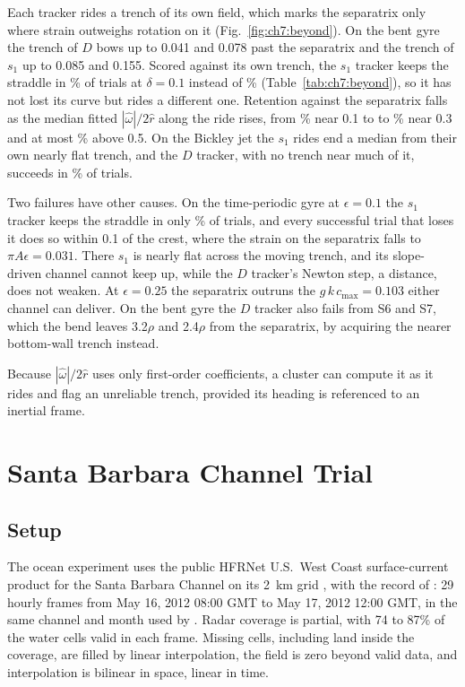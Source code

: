 Each tracker rides a trench of its own field, which marks the separatrix
only where strain outweighs rotation on it (Fig.~\ref{fig:ch7:beyond}). On the bent gyre the trench of $D$ bows up to
0.041 and 0.078 past the separatrix and the trench of $s_1$ up to 0.085
and 0.155. Scored against its own trench, the $s_1$ tracker keeps the
straddle in \% of trials at $\delta = 0.1$ instead of
\% (Table~\ref{tab:ch7:beyond}), so it has not lost its curve but
rides a different one. Retention against the
separatrix falls as the median fitted $|\hat{\omega}|/2\hat{r}$ along the
ride rises, from \% near 0.1 to  to \% near 0.3
and at most \% above 0.5. On the Bickley jet the $s_1$ rides end a
median  from their own nearly flat trench, and the $D$
tracker, with no trench near much of it, succeeds in \% of
trials.

Two failures have other causes. On the time-periodic gyre at
$\epsilon = 0.1$ the $s_1$ tracker keeps the straddle in only \%
of trials, and every successful trial that loses it does so within 0.1 of
the crest, where the strain on the separatrix falls to
$\pi A\epsilon = 0.031$. There $s_1$ is nearly flat across the
moving trench, and its slope-driven channel cannot keep up, while the $D$
tracker's Newton step, a distance, does not weaken. At $\epsilon = 0.25$
the separatrix outruns the $g\,k\,c_{\max} = 0.103$ either channel
can deliver. On the bent gyre the $D$ tracker also fails from S6 and S7,
which the bend leaves 3.2$\rho$ and 2.4$\rho$ from the
separatrix, by acquiring the nearer bottom-wall trench instead.

Because $|\hat{\omega}|/2\hat{r}$ uses only first-order coefficients, a
cluster can compute it as it rides and flag an unreliable trench, provided
its heading is referenced to an inertial frame.

\section{Santa Barbara Channel Trial}
\label{sec:ch7:ocean}

\subsection{Setup}
\label{sec:ch7:ocean_sim}

The ocean experiment uses the public HFRNet U.S.~West Coast surface-current
product for the Santa Barbara Channel on its 2~km grid \cite{66,67}, with
the record of \cite{27}: 29 hourly frames from May 16, 2012 08:00 GMT to
May 17, 2012 12:00 GMT, in the same channel and month used by \cite{6}.
Radar coverage is partial, with 74 to 87\% of the water cells valid in
each frame. Missing cells, including land inside the coverage, are filled
by linear interpolation, the field is zero beyond valid data, and
interpolation is bilinear in space, linear in time.

